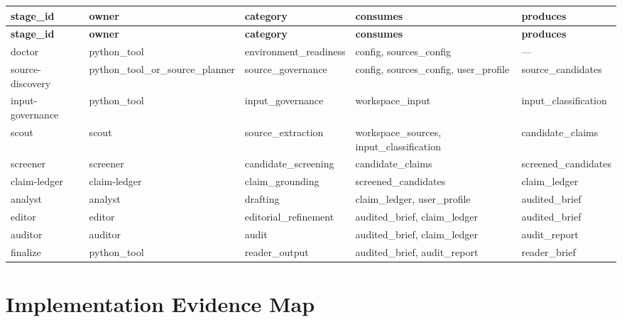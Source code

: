 \documentclass[11pt,a4paper]{article}
\begin{document}
\begin{table}[ht]
\centering
\footnotesize
\begin{longtable}{@{}lllll@{}}
\toprule
\textbf{stage\_id} & \textbf{owner} & \textbf{category} & \textbf{consumes} & \textbf{produces} \\
\midrule
\endfirsthead
\toprule
\textbf{stage\_id} & \textbf{owner} & \textbf{category} & \textbf{consumes} & \textbf{produces} \\
\midrule
\endhead
doctor & python\_tool & environment\_readiness & config, sources\_config & --- \\
source-discovery & python\_tool\_or\_source\_planner & source\_governance & config, sources\_config, user\_profile & source\_candidates \\
input-governance & python\_tool & input\_governance & workspace\_input & input\_classification \\
scout & scout & source\_extraction & workspace\_sources, input\_classification & candidate\_claims \\
screener & screener & candidate\_screening & candidate\_claims & screened\_candidates \\
claim-ledger & claim-ledger & claim\_grounding & screened\_candidates & claim\_ledger \\
analyst & analyst & drafting & claim\_ledger, user\_profile & audited\_brief \\
editor & editor & editorial\_refinement & audited\_brief, claim\_ledger & audited\_brief \\
auditor & auditor & audit & audited\_brief, claim\_ledger & audit\_report \\
finalize & python\_tool & reader\_output & audited\_brief, audit\_report & reader\_brief \\
\bottomrule
\end{longtable}
\end{table}

\section{Implementation Evidence Map}
\end{document}
